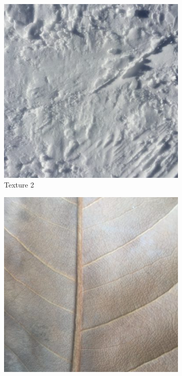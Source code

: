 \documentclass{article}
\begin{document}
\begin{figure}[htbp!]
    \centering
    \begin{subfigure}[b]{0.3\textwidth}
        \includegraphics[width=\textwidth]{../Code/Textures/2.png}
        \caption{Texture 2}
        \label{fig:texture-2}
    \end{subfigure}
    \hfill %
    \begin{subfigure}[b]{0.3\textwidth}
        \includegraphics[width=\textwidth]{../Code/Textures/4.png}

\end{subfigure}
\end{figure}
\end{document}
